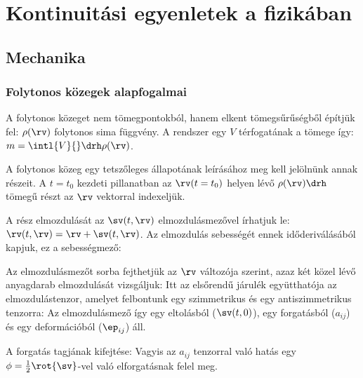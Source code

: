 \chapter{Kontinuitási egyenletek a fizikában}
  
 \section{Mechanika}
  
  \subsection{Folytonos közegek alapfogalmai}
   
   A folytonos közeget nem tömegpontokból, hanem elkent tömegsűrűségből építjük fel: $\rho(\rv)$ folytonos sima függvény.
   A rendszer egy $V$ térfogatának a tömege így: $m=\intl{V}{}\drh\rho(\rv)$. 
   
   A folytonos közeg egy tetszőleges állapotának leírásához meg kell jelölnünk annak részeit.
   A $t=t_0$ kezdeti pillanatban az $\rv(t=t_0)$ helyen lévő $\rho(\rv)\drh$ tömegű részt az $\rv$ vektorral indexeljük.
   
   A rész elmozdulását az $\sv(t,\rv)$ elmozdulásmezővel írhatjuk le: $\rv(t,\rv)=\rv+\sv(t,\rv)$.
   Az elmozdulás sebességét ennek időderiválásából kapjuk, ez a sebességmező: 
    
   Az elmozdulásmezőt sorba fejthetjük az $\rv$ változója szerint, azaz két közel lévő anyagdarab elmozdulását vizsgáljuk:
   Itt az elsőrendű járulék együtthatója az elmozdulástenzor, amelyet felbontunk egy szimmetrikus és egy antiszimmetrikus tenzorra: 
   Az elmozdulásmező így egy eltolásból ($\sv(t,0)$), egy forgatásból ($a_{ij}$) és egy deformációból ($\ep_{ij}$) áll.
   
   A forgatás tagjának kifejtése: 
   Vagyis az $a_{ij}$ tenzorral való hatás egy $\phi=\frac{1}{2}\rot{\sv}$-vel való elforgatásnak felel meg. 
   
